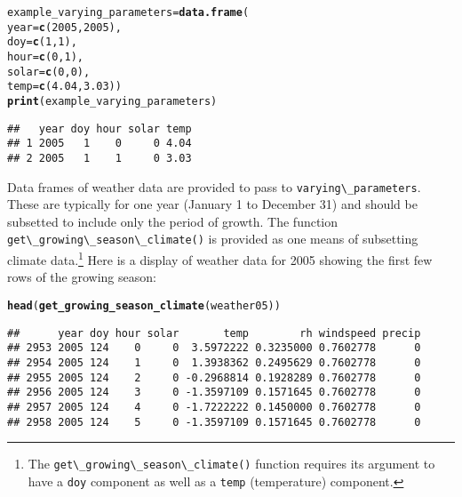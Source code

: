 \documentclass{article}\usepackage[]{graphicx}\usepackage[]{color}
\makeatletter
\newcommand{\hlnum}[1]{\textcolor[rgb]{0.686,0.059,0.569}{#1}}%
\newcommand{\hlstd}[1]{\textcolor[rgb]{0.345,0.345,0.345}{#1}}%
\newcommand{\hlkwb}[1]{\textcolor[rgb]{0.69,0.353,0.396}{#1}}%
\newcommand{\hlkwc}[1]{\textcolor[rgb]{0.333,0.667,0.333}{#1}}%
\newcommand{\hlkwd}[1]{\textcolor[rgb]{0.737,0.353,0.396}{\textbf{#1}}}%
\newenvironment{kframe}{%
 \def\at@end@of@kframe{}%
 \ifinner\ifhmode%
  \def\at@end@of@kframe{\end{minipage}}%
  \begin{minipage}{\columnwidth}%
 \fi\fi%
 \def\FrameCommand##1{\hskip\@totalleftmargin \hskip-\fboxsep
 \colorbox{shadecolor}{##1}\hskip-\fboxsep
     \hskip-\linewidth \hskip-\@totalleftmargin \hskip\columnwidth}%
 \MakeFramed {\advance\hsize-\width
   \@totalleftmargin\z@ \linewidth\hsize
   \@setminipage}}%
 {\par\unskip\endMakeFramed%
 \at@end@of@kframe}
\newenvironment{knitrout}{}{} %
\newcommand{\code}[1]{\lstinline[style=C++style]{#1}}
\makeatother
\begin{document}
\begin{knitrout}
\color{fgcolor}\begin{kframe}
\begin{alltt}
\hlstd{example_varying_parameters} \hlkwb{=} \hlkwd{data.frame}\hlstd{(}
            \hlkwc{year} \hlstd{=} \hlkwd{c}\hlstd{(}\hlnum{2005}\hlstd{,} \hlnum{2005}\hlstd{),}
            \hlkwc{doy} \hlstd{=} \hlkwd{c}\hlstd{(}\hlnum{1}\hlstd{,} \hlnum{1}\hlstd{),}
            \hlkwc{hour} \hlstd{=} \hlkwd{c}\hlstd{(}\hlnum{0}\hlstd{,} \hlnum{1}\hlstd{),}
            \hlkwc{solar} \hlstd{=} \hlkwd{c}\hlstd{(}\hlnum{0}\hlstd{,} \hlnum{0}\hlstd{),}
            \hlkwc{temp} \hlstd{=} \hlkwd{c}\hlstd{(}\hlnum{4.04}\hlstd{,} \hlnum{3.03}\hlstd{))}
\hlkwd{print}\hlstd{(example_varying_parameters)}
\end{alltt}
\begin{verbatim}
##   year doy hour solar temp
## 1 2005   1    0     0 4.04
## 2 2005   1    1     0 3.03
\end{verbatim}
\end{kframe}
\end{knitrout}

Data frames of weather data are provided to pass to
\code{varying\_parameters}. These are typically for one year (January
1 to December 31) and should be subsetted to include only the period
of growth.  The function \code{get\_growing\_season\_climate()} is
provided as one means of subsetting climate data.\footnote{The
  \code{get\_growing\_season\_climate()} function requires its
  argument to have a \code{doy} component as well as a \code{temp}
  (temperature) component.}  Here is a display of weather data for
2005 showing the first few rows of the growing season:

\begin{knitrout}
\color{fgcolor}\begin{kframe}
\begin{alltt}
\hlkwd{head}\hlstd{(}\hlkwd{get_growing_season_climate}\hlstd{(weather05))}
\end{alltt}
\begin{verbatim}
##      year doy hour solar       temp        rh windspeed precip
## 2953 2005 124    0     0  3.5972222 0.3235000 0.7602778      0
## 2954 2005 124    1     0  1.3938362 0.2495629 0.7602778      0
## 2955 2005 124    2     0 -0.2968814 0.1928289 0.7602778      0
## 2956 2005 124    3     0 -1.3597109 0.1571645 0.7602778      0
## 2957 2005 124    4     0 -1.7222222 0.1450000 0.7602778      0
## 2958 2005 124    5     0 -1.3597109 0.1571645 0.7602778      0
\end{verbatim}
\end{kframe}
\end{knitrout}
\end{document}
